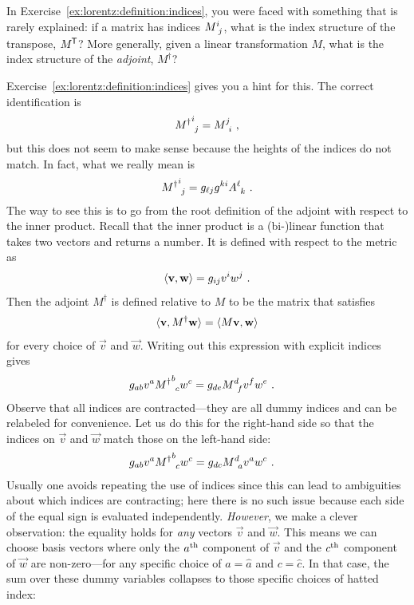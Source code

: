 \documentclass[12pt, oneside]{report}    %
\begin{document}
\begin{example}
In Exercise~\ref{ex:lorentz:definition:indices}, you were faced with something that is rarely explained: if a matrix has indices $M\aij{i}{j}$, what is the index structure of the transpose, $M^{\mkern-1.5mu\mathsf{T}}$? More generally, given a linear transformation $M$, what is the index structure of the \emph{adjoint}, $M^\dag$? 

Exercise~\ref{ex:lorentz:definition:indices} gives you a hint for this. The correct identification is
\begin{align}
    {M^\dag}\aij{i}{j} = M\aij{j}{i} \ ,
\end{align}
but this does not seem to make sense because the heights of the indices do not match. In fact, what we really mean is
\begin{align}
    {M^\dag}\aij{i}{j} = g_{\ell j} g^{ki} A\aij{\ell}{k} \ .
    \label{eq:def:adjoint}
\end{align}
The way to see this is to go from the root definition of the adjoint with respect to the inner product. Recall that the inner product is a (bi-)linear function that takes two vectors and returns a number. It is defined with respect to the metric as
\begin{align}
    \langle \mathbf{v}, \mathbf{w} \rangle = g_{ij}v^iw^j \ .
\end{align}
Then the adjoint $M^\dag$ is defined relative to $M$ to be the matrix that satisfies
\begin{align}
    \langle \mathbf{v}, M^\dag \mathbf{w} \rangle = 
    \langle M \mathbf{v}, \mathbf{w} \rangle
\end{align}
for every choice of $\vec{v}$ and $\vec{w}$. Writing out this expression with explicit indices gives
\begin{align}
    g_{ab} v^a {M^\dag}\aij{b}{c} w^c
    &= 
    g_{de} M\aij{d}{f}v^f w^e 
    \ .
\end{align}
Observe that all indices are contracted---they are all dummy indices and can be relabeled for convenience. Let us do this for the right-hand side so that the indices on $\vec{v}$ and $\vec{w}$ match those on the left-hand side:
\begin{align}
    g_{ab} {v^a} {M^\dag}\aij{b}{c} {w^c}
    &= 
    g_{dc} M\aij{d}{a} {v^a} {w^c}
    \ .
\end{align}
Usually one avoids repeating the use of indices since this can lead to ambiguities about which indices are contracting; here there is no such issue because each side of the equal sign is evaluated independently. \emph{However}, we make a clever observation: the equality holds for \emph{any} vectors $\vec{v}$ and $\vec{w}$. This means we can choose basis vectors where only the $a^\textnormal{th}$ component of $\vec{v}$ and the $c^\textnormal{th}$ component of $\vec{w}$ are non-zero---for any specific choice of $a = \hat{a}$ and $c = \hat c$. In that case, the sum over these dummy variables collapses to those specific choices of hatted index:

\end{example}
\end{document}
